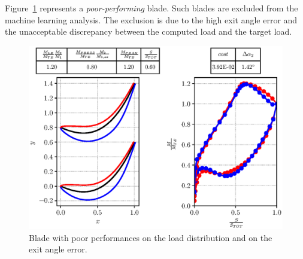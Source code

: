Figure~\ref{fig:badBlade} represents a \textit{poor-performing} blade. Such blades are excluded from the machine learning analysis. 
The exclusion is due to the high exit angle error and the unacceptable discrepancy between the computed load and the target load.

\begin{figure}[H]
    \centering
    \hspace*{-0.6cm}
    \includegraphics[scale=\scaleBlade]{./images/bladeVal1962.eps}
    \caption{Blade with poor performances on the load distribution and on the exit angle error.}
    \label{fig:badBlade}
\end{figure}

% 

